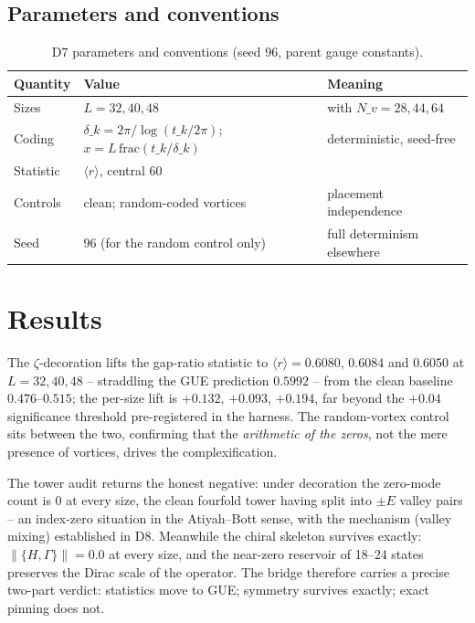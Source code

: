 \documentclass[11pt,a4paper]{article}
\begin{document}
\subsection{Parameters and conventions}
\begin{table}[htbp]\centering\small
\begin{tabularx}{\columnwidth}{@{}l l X@{}}
\toprule
Quantity & Value & Meaning \\
\midrule
Sizes & $L = 32, 40, 48$ & with $N\_v = 28, 44, 64$ \\
Coding & $\delta\_k = 2\pi/\log(t\_k/2\pi)$; $x = L\,\mathrm{frac}(t\_k/\delta\_k)$ & deterministic, seed-free \\
Statistic & $\langle r\rangle$, central 60\\%
Controls & clean; random-coded vortices & placement independence \\
Seed & 96 (for the random control only) & full determinism elsewhere \\
\bottomrule
\end{tabularx}
\caption{D7 parameters and conventions (seed 96, parent gauge constants).}
\end{table}

\section{Results}
The $\zeta$-decoration lifts the gap-ratio statistic to $\langle r\rangle = 0.6080$, $0.6084$ and $0.6050$ at $L = 32, 40, 48$ -- straddling the GUE prediction $0.5992$ -- from the clean baseline $0.476$--$0.515$; the per-size lift is $+0.132$, $+0.093$, $+0.194$, far beyond the $+0.04$ significance threshold pre-registered in the harness. The random-vortex control sits between the two, confirming that the \emph{arithmetic of the zeros}, not the mere presence of vortices, drives the complexification.

The tower audit returns the honest negative: under decoration the zero-mode count is $0$ at every size, the clean fourfold tower having split into $\pm E$ valley pairs -- an index-zero situation in the Atiyah--Bott sense, with the mechanism (valley mixing) established in D8. Meanwhile the chiral skeleton survives exactly: $\|\{H,\Gamma\}\| = 0.0$ at every size, and the near-zero reservoir of 18--24 states preserves the Dirac scale of the operator. The bridge therefore carries a precise two-part verdict: statistics move to GUE; symmetry survives exactly; exact pinning does not.
\end{document}
